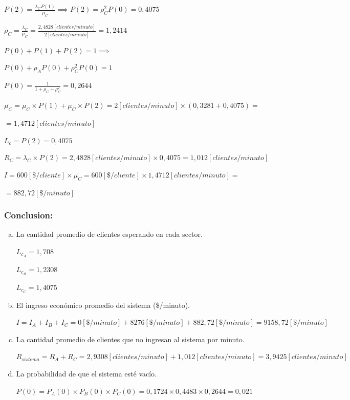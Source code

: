\documentclass[a4paper,11pt]{article}
\begin{document}
$P(2) = \frac{\lambda_C P(1)}{\mu_C} \implies P(2) = \rho_C^2 P(0) = 0,4075$

$\rho_C = \frac{\lambda_C}{\mu_C} = \frac{2,4828[clientes/minuto]}{2[clientes/minuto]} = 1,2414$

$P(0) + P(1) + P(2) = 1 \implies$

$P(0) + \rho_A P(0) +  \rho_C^2 P(0) = 1$

$P(0) = \frac{1}{1 + \rho_C + \rho_C^2} = 0,2644$

$\overline{\mu_C} = \mu_C \times P(1) + \mu_C \times P(2) = 2[clientes/minuto] \times(0,3281 + 0,4075) =$

$= 1,4712[clientes/minuto]$

$L_c = P(2) = 0,4075$

$R_C = \lambda_C \times P(2) = 2,4828[clientes/minuto] \times 0,4075 = 1,012[clientes/minuto]$

$I = 600[\$/cliente] \times \overline{\mu_C} = 600[\$/cliente] \times 1,4712[clientes/minuto] =$

$= 882,72[\$/minuto]$



\vspace{13pt}
\subsubsection{Conclusion:}

\leftskip=36pt
\parindent=-18pt
\begin{enumerate}[a)]
  \item La cantidad promedio de clientes esperando en cada sector.

    $L_{c_A} = 1,708$

    $L_{c_B} = 1,2308$

    $L_{c_C} = 1,4075$

  \vspace{13pt}
  \item El ingreso económico promedio del sistema (\$/minuto).

    $I = I_A + I_B + I_C = 0[\$/minuto] + 8276[\$/minuto] + 882,72[\$/minuto] = 9158,72[\$/minuto]$

  \vspace{13pt}
  \item La cantidad promedio de clientes que no ingresan al sistema por minuto.

    $R_{sistema} = R_A + R_C = 2,9308[clientes/minuto]  + 1,012[clientes/minuto] = 3,9425[clientes/minuto]$

  \vspace{13pt}
  \item La probabilidad de que el sistema esté vacío.

    $P(0) = P_A(0) \times P_B(0) \times P_C(0) = 0,1724 \times 0,4483 \times 0,2644 = 0,021$

\end{enumerate}
\end{document}
